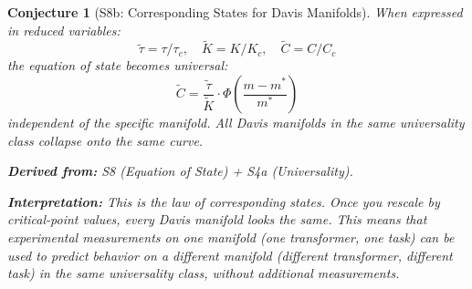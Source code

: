\documentclass[11pt,letterpaper]{article}
\newtheorem{conjecture}{Conjecture}[section]
\begin{document}
\begin{conjecture}[S8b: Corresponding States for Davis 
Manifolds]\label{conj:corresponding}
When expressed in reduced variables:
\begin{equation}
    \tilde{\tau} = \tau / \tau_c, \quad 
    \tilde{K} = K / K_c, \quad 
    \tilde{C} = C / C_c
\end{equation}
the equation of state becomes universal:
\begin{equation}
    \tilde{C} = \frac{\tilde{\tau}}{\tilde{K}} \cdot 
    \Phi\left(\frac{m - m^*}{m^*}\right)
\end{equation}
independent of the specific manifold. All Davis manifolds in the same 
universality class collapse onto the same curve.

\textbf{Derived from:} S8 (Equation of State) + S4a (Universality).

\textbf{Interpretation:} This is the law of corresponding states. Once 
you rescale by critical-point values, every Davis manifold looks the same. 
This means that experimental measurements on one manifold (one transformer, 
one task) can be used to predict behavior on a different manifold (different 
transformer, different task) in the same universality class, without 
additional measurements.
\end{conjecture}
\end{document}
